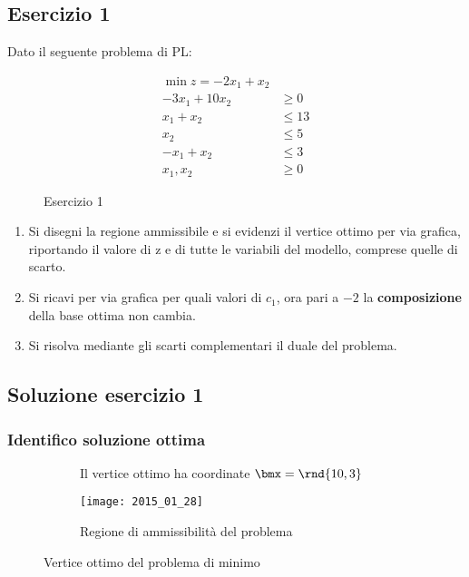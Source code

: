 \documentclass[\main/main.tex]{subfiles}
\begin{document}
\subsection{Esercizio 1}
Dato il seguente problema di PL:

\begin{figure}
  \begin{align*}
    \min z = -2x_1 + x_2    \\
    -3x_1 + 10x_2 & \geq 0  \\
    x_1 + x_2     & \leq 13 \\
    x_2           & \leq 5  \\
    -x_1 + x_2    & \leq 3  \\
    x_1, x_2      & \geq 0
  \end{align*}
  \caption{Esercizio 1}
\end{figure}

\begin{enumerate}
  \item Si disegni la regione ammissibile e si evidenzi il vertice ottimo per via grafica, riportando il valore di z e di tutte le variabili del modello, comprese quelle di scarto.
  \item Si ricavi per via grafica per quali valori di $c_1$, ora pari a $-2$ la \textbf{composizione} della base ottima non cambia.
  \item Si risolva mediante gli scarti complementari il duale del problema.
\end{enumerate}

\subsection{Soluzione esercizio 1}

\subsubsection*{Identifico soluzione ottima}

\begin{figure}
  \begin{subfigure}{0.49\textwidth}
    \caption{Il vertice ottimo ha coordinate $\bmx = \rnd{10,3}$}
  \end{subfigure}
  \begin{subfigure}{0.49\textwidth}
    \texttt{[image: 2015\_01\_28]}
    \caption{Regione di ammissibilità del problema}
  \end{subfigure}
  \caption{Vertice ottimo del problema di minimo}
\end{figure}
\end{document}
